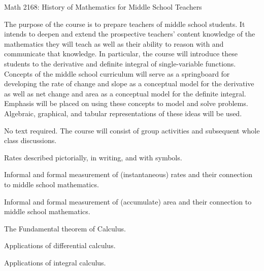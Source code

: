\documentclass{osucourse}
\begin{document}
\CatalogDescription
\PrerequisitesAndExclusions

\begin{FollowupCourses}
Math 2168: History of Mathematics for Middle School Teachers
\end{FollowupCourses}

\begin{Purpose}
The purpose of the course is to prepare teachers of middle school students. It intends to deepen and extend the prospective teachers’ content knowledge of the mathematics they will teach as well as their ability to reason with and communicate that knowledge. In particular, the course will introduce these students to the derivative and definite integral of single-variable functions. Concepts of the middle school curriculum will serve as a springboard for developing the rate of change and slope as a conceptual model for the derivative as well as net change and area as a conceptual model for the definite integral. Emphasis will be placed on using these concepts to model and solve problems. Algebraic, graphical, and tabular representations of these ideas will be used.
\end{Purpose}

\begin{Text}
No text required. The course will consist of group activities and subsequent whole class discussions.
\end{Text}

\begin{TopicsList}
\item Rates described pictorially, in writing, and with symbols.
\item Informal and formal measurement of (instantaneous) rates and their connection to middle school mathematics.
\item Informal and formal measurement of (accumulate) area and their connection to middle school mathematics.
\item The Fundamental theorem of Calculus.
\item Applications of differential calculus.
\item Applications of integral calculus.
\end{TopicsList}
\end{document}
